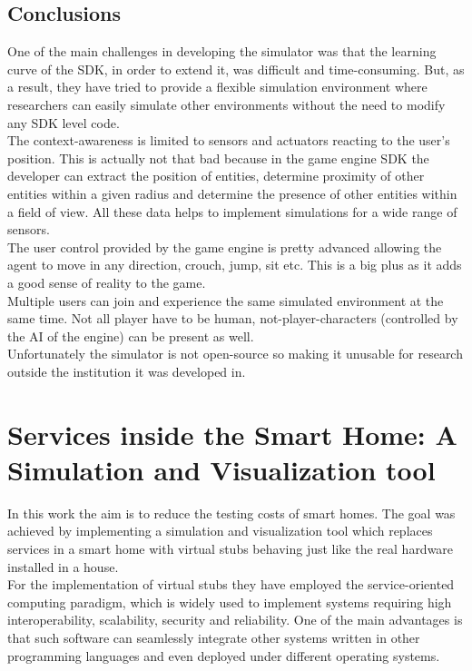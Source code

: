 \subsection{Conclusions}

One of the main challenges in developing the simulator was that the learning curve of the SDK, in order to extend it, was difficult and time-consuming. But, as a result, they have tried to provide a flexible simulation environment where researchers can easily simulate other environments without the need to modify any SDK level code.\\

The context-awareness is limited to sensors and actuators reacting to the user's position. This is actually not that bad because in the game engine SDK the developer can extract the position of entities, determine proximity of other entities within a given radius and determine the presence of other entities within a field of view. All these data helps to implement simulations for a wide range of sensors.\\

The user control provided by the game engine is pretty advanced allowing the agent to move in any direction, crouch, jump, sit etc. This is a big plus as it adds a good sense of reality to the game.\\

Multiple users can join and experience the same simulated environment at the same time. Not all player have to be human, not-player-characters (controlled by the AI of the engine) can be present as well.\\

Unfortunately the simulator is not open-source so making it unusable for research outside the institution it was developed in.

\section{Services inside the Smart Home: A Simulation and Visualization tool}\label{sec:services_in_smart_homes}

In this work \cite{lazovik2009services} the aim is to reduce the testing costs of smart homes. The goal was achieved by implementing a simulation and visualization tool which replaces services in a smart home with virtual stubs behaving just like the real hardware installed in a house.\\

For the implementation of virtual stubs they have employed the service-oriented computing paradigm, which is widely used to implement systems requiring high interoperability, scalability, security and reliability. One of the main advantages is that such software can seamlessly integrate other systems written in other programming languages and even deployed under different operating systems.\\

